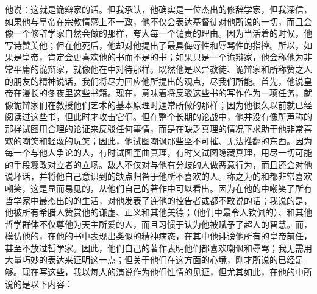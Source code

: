他说：这就是诡辩家的话。但我承认，他确实是一位杰出的修辞学家，但我深信，如果他与皇帝在宗教情感上不一致，他不仅会表达基督徒对他所说的一切，而且会像一个修辞学家自然会做的那样，夸大每一个谴责的理由。因为当活着的时候，他写诗赞美他；但在他死后，他却对他提出了最具侮辱性和辱骂性的指控。所以，如果是皇帝，肯定会更喜欢他的书而不是的书；如果只是一个诡辩家，他会称他为非常平庸的诡辩家，就像他在中对待那样。既然他是以异教徒、诡辩家和所称赞之人的朋友的精神说话，我们将尽力回应他所提出的观点，尽我们所能。首先，他说皇帝在漫长的冬夜里这些书籍。现在，意味着将反驳这些书的写作作为一项任务，就像诡辩家们在教授他们艺术的基本原理时通常所做的那样；因为他很久以前就已经阅读过这些书，但此时才攻击它们。但在整个长期的论战中，他并没有像所声称的那样试图用合理的论证来反驳任何事情，而是在缺乏真理的情况下求助于他非常喜欢的嘲笑和轻蔑的玩笑；因此，他试图嘲讽那些坚不可摧、无法推翻的东西。因为每一个与他人争论的人，有时试图歪曲真理，有时又试图隐藏真理，用尽一切可能的手段篡改对立者的立场。敌人不仅对与他有分歧的人做恶意行为，而且还会对他说坏话，并将他自己意识到的缺点归咎于他所不喜欢的人。称之为的和都非常喜欢嘲笑，这是显而易见的，从他们自己的著作中可以看出。因为在他的中嘲笑了所有哲学家中最杰出的的生活，对他发表了连他的控告者或都不敢说的话；我说的是，他被所有希腊人赞赏他的谦虚、正义和其他美德；（他们中最令人钦佩的）、和其他哲学群体不仅尊他为天主所爱的人，而且习惯于认为他被赋予了超人的智慧。而，模仿他的，在他的书中表现出类似的精神病态，在其中他诽谤他所有的皇帝前任，甚至不放过哲学家。因此，他们自己的著作表明他们都喜欢嘲讽和辱骂；我无需用大量巧妙的表达来证明这一点；但关于他们在这方面的心境，刚才所说的已经足够。现在写这些，我以每人的演说作为他们性情的见证，但尤其如此，在他的中所说的是以下内容：\par

